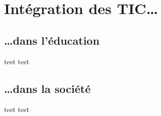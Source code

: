 \section{Intégration des TIC\ldots}

\subsection{\ldots dans l'éducation}

\begin{frame}{test}
test
\end{frame}

\subsection{\ldots dans la société}

\begin{frame}{test}
test
\end{frame}
